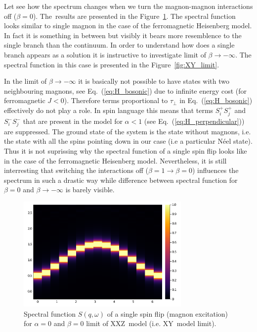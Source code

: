 \documentclass[12pt, a4paper]{article}
\begin{document}
Let see how the spectrum changes when we turn the magnon-magnon interactions off ($\beta = 0$). The~results are presented in the Figure~\ref{fig:XY_noint}. The spectral function looks similar to single magnon in the case of the ferromagnetic Heisenberg model. In fact it is something in between but visibly it bears more resemblence to the single branch than the continuum. In order to understand how does a single branch appears as a solution it is instructive to investigate limit of $\beta \to -\infty$. The spectral function in this case is presented in the Figure~\ref{fig:XY_limit}. 

In the limit of $\beta \to -\infty$ it is basically not possible to have states with two neighbouring magnons, see Eq.~(\ref{eq:H_bosonic}) due to infinite energy cost (for ferromagnetic $J<0$). Therefore terms proportional to $\tau_{\perp}$ in Eq.~(\ref{eq:H_bosonic}) effectively do not play a role. In spin language this means that terms $S_i^+ S_j^+$ and $S_i^- S_j^-$ that are present in the model for $\alpha < 1$ (see Eq.~(\ref{eq:H_perpendicular})) are suppressed. The ground state of the system is the state without magnons, i.e. the state with all the spins pointing down in our case (i.e a particular N\'eel state). Thus it is not suprissing why the spectral function of a single spin flip looks like in the case of the ferromagnetic Heisenberg model. Nevertheless, it is still interresting that switching the interactions off ($\beta = 1 \rightarrow \beta = 0$) influences the spectrum in such a drastic way while difference between spectral function for $\beta = 0$ and $\beta \to -\infty$ is barely visible.
\begin{figure}[ht]
	\centering
	\includegraphics[width=0.75\textwidth]{../figures/fig002.png}
	\caption{Spectral function $S(q,\omega)$ of a single spin flip (magnon excitation) for $\alpha = 0$ and $\beta = 0$ limit of XXZ~model (i.e. XY~model limit).}\label{fig:XY_noint}
\end{figure}
\end{document}
